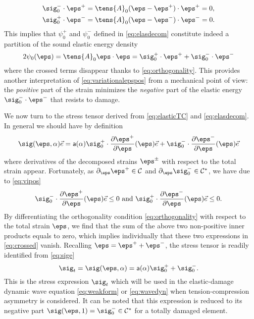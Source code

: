 \begin{equation} \label{eq:orthogonality}
\begin{aligned}
\sig_0^-\cdot\eps^+ &= \tens{A}_0(\eps-\eps^+)\cdot\eps^+=0, \\
\sig_0^+\cdot\eps^- &= \tens{A}_0(\eps-\eps^-)\cdot\eps^-=0.
\end{aligned}
\end{equation}
This implies that $\psi_0^+$ and $\psi_0^-$ defined in \eqref{eq:elasdecom} constitute indeed a partition of the sound elastic energy density
\[
2\psi_0(\eps)=\tens{A}_0\eps\cdot\eps=\sig_0^+\cdot\eps^++\sig_0^-\cdot\eps^-
\]
where the crossed terms disappear thanks to \eqref{eq:orthogonality}. This provides another interpretation of \eqref{eq:variationalepspos} from a mechanical point of view: the \emph{positive} part of the strain minimizes the \emph{negative} part of the elastic energy $\sig_0^-\cdot\eps^-$ that resists to damage.

We now turn to the stress tensor derived from \eqref{eq:elasticTC} and \eqref{eq:elasdecom}. In general we should have by definition
\begin{equation} \label{eq:sige}
\sig(\eps,\alpha)\vec{e}=\mathsf{a}(\alpha)\sig_0^+\cdot\frac{\partial\eps^+}{\partial\eps}(\eps)\vec{e}+\sig_0^-\cdot\frac{\partial\eps^-}{\partial\eps}(\eps)\vec{e}
\end{equation}
where derivatives of the decomposed strains $\eps^\pm$ with respect to the total strain appear. Fortunately, as $\partial_{\eps}\eps^+\in\mathcal{C}$ and $\partial_{\eps}\sig_0^-\in\mathcal{C}^*$, we have due to \eqref{eq:vipos}
\begin{equation} \label{eq:crossed}
\sig_0^-\cdot\frac{\partial\eps^+}{\partial\eps}(\eps)\vec{e}\leq 0\text{ and }\sig_0^+\cdot\frac{\partial\eps^-}{\partial\eps}(\eps)\vec{e}\leq 0.
\end{equation}
By differentiating the orthogonality condition \eqref{eq:orthogonality} with respect to the total strain $\eps$, we find that the sum of the above two non-positive inner products equals to zero, which implies individually that these two expressions in \eqref{eq:crossed} vanish. Recalling $\eps=\eps^++\eps^-$, the stress tensor is readily identified from \eqref{eq:sige}
\begin{equation} \label{eq:stressposneg}
\sig_t=\sig(\eps,\alpha)=\mathsf{a}(\alpha)\sig_0^++\sig_0^-.
\end{equation}
This is the stress expression $\sig_t$ which will be used in the elastic-damage dynamic wave equation \eqref{eq:weakform} or \eqref{eq:wavedyn} when tension-compression asymmetry is considered. It can be noted that this expression is reduced to its negative part $\sig(\eps,1)=\sig_0^-\in\mathcal{C}^*$ for a totally damaged element.

